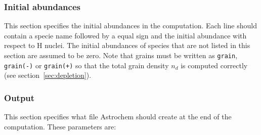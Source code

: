 \documentclass[a4paper,12pt]{article}
\begin{document}
\subsubsection{Initial abundances}
\label{sec:initial-abundances}

This section specifies the initial abundances in the computation. Each
line should contain a specie name followed by a equal sign and the
initial abundance with respect to H nuclei. The initial abundances of
species that are not listed in this section are assumed to be
zero. Note that grains must be written as \verb=grain=,
\verb=grain(-)= or \verb=grain(+)= so that the total grain density
$n_{d}$ is computed correctly (see section~\ref{sec:depletion}).

\subsubsection{Output}
\label{sec:output}

This section specifies what file Astrochem should create at the end of
the computation. These parameters are:
\end{document}
